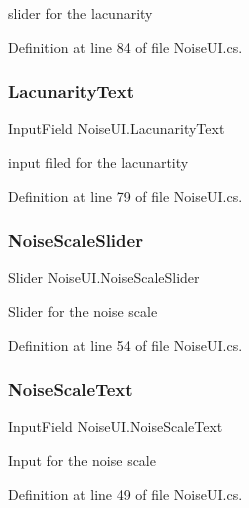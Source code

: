 slider for the lacunarity 



Definition at line 84 of file Noise\+U\+I.\+cs.

\mbox{\label{class_noise_u_i_a03c736918ca6ebf78df664fc3dc6b371}} 
\subsubsection{Lacunarity\+Text}
{\footnotesize\ttfamily Input\+Field Noise\+U\+I.\+Lacunarity\+Text}



input filed for the lacunartity 



Definition at line 79 of file Noise\+U\+I.\+cs.

\mbox{\label{class_noise_u_i_a796055f9dccc008d6af4e752167e7347}} 
\subsubsection{Noise\+Scale\+Slider}
{\footnotesize\ttfamily Slider Noise\+U\+I.\+Noise\+Scale\+Slider}



Slider for the noise scale 



Definition at line 54 of file Noise\+U\+I.\+cs.

\mbox{\label{class_noise_u_i_ac77cdd78a9b332cca4af7726cfcf505b}} 
\subsubsection{Noise\+Scale\+Text}
{\footnotesize\ttfamily Input\+Field Noise\+U\+I.\+Noise\+Scale\+Text}



Input for the noise scale 



Definition at line 49 of file Noise\+U\+I.\+cs.

\mbox{\label{class_noise_u_i_aca065f90ef9785bd7061b244325f018e}} 

